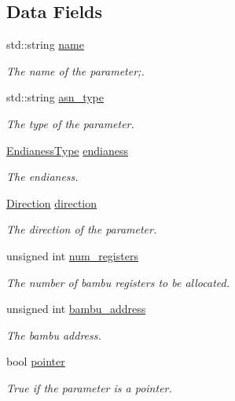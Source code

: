 \subsection*{Data Fields}
\begin{DoxyCompactItemize}
\item 
std\+::string \hyperlink{structAadlInformation_1_1AadlParameter_a194c78854a75d7569ceb24985173e9da}{name}
\begin{DoxyCompactList}\small\item\em The name of the parameter;. \end{DoxyCompactList}\item 
std\+::string \hyperlink{structAadlInformation_1_1AadlParameter_a9374191ab44514ad5a5b5ae8cd4f8e94}{asn\+\_\+type}
\begin{DoxyCompactList}\small\item\em The type of the parameter. \end{DoxyCompactList}\item 
\hyperlink{structAadlInformation_1_1AadlParameter_a1b095cc6220ca218732206b6c3994192}{Endianess\+Type} \hyperlink{structAadlInformation_1_1AadlParameter_a17065b7d9136e97ef5908369b546a8b3}{endianess}
\begin{DoxyCompactList}\small\item\em The endianess. \end{DoxyCompactList}\item 
\hyperlink{structAadlInformation_1_1AadlParameter_a4f3dba322ae2eb8ecec6f6199f81a77e}{Direction} \hyperlink{structAadlInformation_1_1AadlParameter_ac67ae9d2e5bf88c3a4a6c24ff97cadeb}{direction}
\begin{DoxyCompactList}\small\item\em The direction of the parameter. \end{DoxyCompactList}\item 
unsigned int \hyperlink{structAadlInformation_1_1AadlParameter_a7ee0fc3dd62cdd90789aee42872fe178}{num\+\_\+registers}
\begin{DoxyCompactList}\small\item\em The number of bambu registers to be allocated. \end{DoxyCompactList}\item 
unsigned int \hyperlink{structAadlInformation_1_1AadlParameter_a1454505e1144db93ebbee85dbc7eee28}{bambu\+\_\+address}
\begin{DoxyCompactList}\small\item\em The bambu address. \end{DoxyCompactList}\item 
bool \hyperlink{structAadlInformation_1_1AadlParameter_a8f8d2acef296e4249679d6754641e746}{pointer}
\begin{DoxyCompactList}\small\item\em True if the parameter is a pointer. \end{DoxyCompactList}\end{DoxyCompactItemize}


